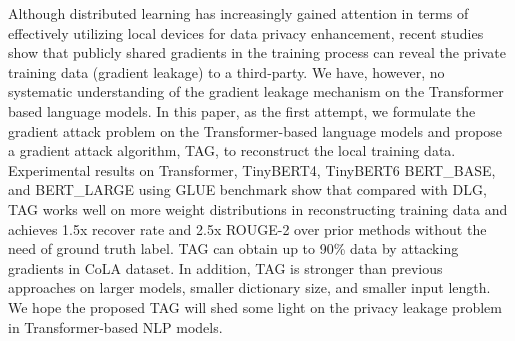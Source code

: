Although distributed    learning    has   increasingly gained  attention  in  terms  of  effectively  utilizing  local  devices for data privacy enhancement, recent studies show that publicly shared  gradients  in  the  training  process  can  reveal  the  private training data (gradient leakage) to a third-party. We have, however, no systematic understanding of the gradient leakage mechanism on the Transformer based language models. In this paper, as the first attempt, we formulate the gradient attack problem on  the Transformer-based language models and propose a gradient  attack  algorithm,  TAG,  to  reconstruct  the  local  training  data. Experimental  results  on  Transformer,  TinyBERT4,  TinyBERT6 BERT\_BASE,  and  BERT\_LARGE using  GLUE  benchmark  show that compared  with  DLG,  TAG  works  well  on  more  weight distributions  in  reconstructing  training  data  and  achieves  1.5x recover rate and 2.5x ROUGE-2 over prior methods without the need of ground truth label.  TAG  can obtain up to 90\% data by attacking gradients in CoLA dataset. In addition, TAG is stronger than  previous  approaches  on  larger  models,  smaller  dictionary size,  and  smaller  input  length.  We  hope  the  proposed  TAG  will shed some light on the privacy leakage problem in Transformer-based  NLP  models.
